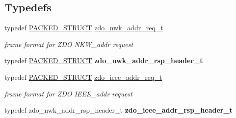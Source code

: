 \subsection*{Typedefs}
\begin{DoxyCompactItemize}
\item 
typedef \hyperlink{group___s_x_a_ga4233297bd31be5c273d4fb0758cc54d7}{P\-A\-C\-K\-E\-D\-\_\-\-S\-T\-R\-U\-C\-T} \hyperlink{group__zdo_gac1680800358ab1c7a6690c3a3f2628ff}{zdo\-\_\-nwk\-\_\-addr\-\_\-req\-\_\-t}
\begin{DoxyCompactList}\small\item\em frame format for Z\-D\-O N\-K\-W\-\_\-addr request \end{DoxyCompactList}\item 
typedef \hyperlink{group___s_x_a_ga4233297bd31be5c273d4fb0758cc54d7}{P\-A\-C\-K\-E\-D\-\_\-\-S\-T\-R\-U\-C\-T} {\bfseries zdo\-\_\-nwk\-\_\-addr\-\_\-rsp\-\_\-header\-\_\-t}
\item 
typedef \hyperlink{group___s_x_a_ga4233297bd31be5c273d4fb0758cc54d7}{P\-A\-C\-K\-E\-D\-\_\-\-S\-T\-R\-U\-C\-T} \hyperlink{group__zdo_ga750ebc1379ded82ecdd43bf07306a812}{zdo\-\_\-ieee\-\_\-addr\-\_\-req\-\_\-t}
\begin{DoxyCompactList}\small\item\em frame format for Z\-D\-O I\-E\-E\-E\-\_\-addr request \end{DoxyCompactList}\item 
\hypertarget{group__zdo_ga3aaa32dc1a5568dbe64ee5e80696d2f6}{typedef zdo\-\_\-nwk\-\_\-addr\-\_\-rsp\-\_\-header\-\_\-t {\bfseries zdo\-\_\-ieee\-\_\-addr\-\_\-rsp\-\_\-header\-\_\-t}}\label{group__zdo_ga3aaa32dc1a5568dbe64ee5e80696d2f6}


\end{DoxyCompactItemize}
